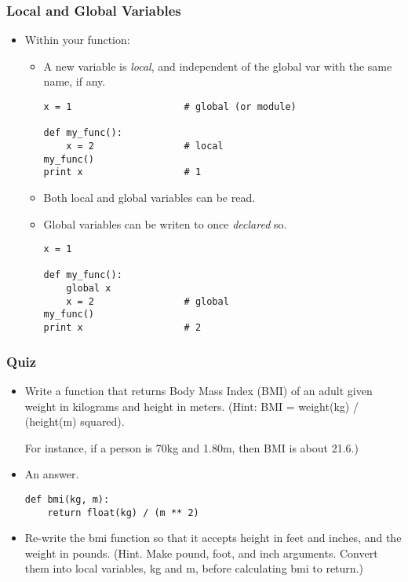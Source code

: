 \documentclass{beamer}
\begin{document}
\begin{frame}[fragile]
\frametitle{Local and Global Variables}
\begin{itemize}
\item Within your function:
\begin{itemize}
\item A new variable 
      is \emph{local}, and independent of the global
      var with the same name, if any.
\begin{lstlisting}
x = 1                    # global (or module)

def my_func():
    x = 2                # local 
my_func()                
print x                  # 1
\end{lstlisting}
\item Both local and global variables can be read.
\item Global variables can be writen to once \emph{declared} so.
\begin{lstlisting}
x = 1                    

def my_func():
    global x
    x = 2                # global 
my_func()                
print x                  # 2
\end{lstlisting}
\end{itemize}
\end{itemize}
\end{frame}

\begin{frame}[fragile]
\frametitle{Quiz}
\begin{itemize}
\item Write a function that returns Body Mass Index
      (BMI)
      of an adult given weight in kilograms and 
      height in meters.
      (Hint: BMI = weight(kg) / (height(m) squared).

      For instance, if a person is 70kg and 1.80m,
      then BMI is about 21.6.)

\item<2-> An answer.
\begin{lstlisting}
def bmi(kg, m):
    return float(kg) / (m ** 2)
\end{lstlisting}
\item<3-> Re-write
    the bmi function so that it accepts height in feet
    and inches, and the weight in pounds. (Hint. Make pound, foot,
    and inch arguments. Convert them into local
    variables, kg and m, before calculating bmi to return.)
\end{itemize}
\end{frame}
\end{document}
